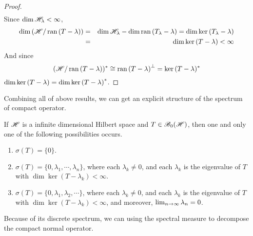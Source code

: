 \documentclass[a4paper,11pt]{report}
\begin{document}
\begin{proof}
\begin{eqnarray*}
	\end{eqnarray*}
	Since $\dim{\mathscr{H}_{\lambda}} < \infty$,
	\begin{eqnarray*}
		\dim{(\mathscr{H}/ \operatorname{ran}{(T-\lambda)})} &=& \dim{\mathscr{H}_{\lambda}} - \dim{\operatorname{ran}{(T_{\lambda}-\lambda)}} = \dim{\ker{(T_{\lambda}-\lambda)}} \\
		&=& \dim{\ker{(T-\lambda)}} < \infty
	\end{eqnarray*}
	And since
	\begin{equation*}
		(\mathscr{H} / \operatorname{ran}{(T-\lambda)})^{*} \cong \operatorname{ran}{(T-\lambda)}^{\bot} = \ker{(T-\lambda)^{*}}
	\end{equation*}
	$\dim{\ker{(T-\lambda)}} = \dim{\ker{(T-\lambda)}^{*}}$.
\end{proof}

Combining all of above results, we can get an explicit structure of the spectrum of compact operator.

\begin{thm}[Riesz]
	If $\mathscr{H}$ is a infinite dimensional Hilbert space and $T \in \mathscr{B}_{0}\mathscr{(H)}$, then one and only one of the following possibilities occurs.
	\begin{enumerate}[label=\arabic*)]
		\item $\sigma(T) = \{0\}$.
		\item $\sigma(T) = \{0,\lambda_1,\cdots,\lambda_n\}$, where each $\lambda_k \neq 0$, and each $\lambda_k$ is the eigenvalue of $T$ with $\dim{\ker{(T-\lambda_k)}}<\infty$.
		\item $\sigma(T) = \{0,\lambda_1,\lambda_2,\cdots\}$, where each $\lambda_k \neq 0$, and each $\lambda_k$ is the eigenvalue of $T$ with $\dim{\ker{(T-\lambda_k)}}<\infty$, and moreover, $\lim_{n \rightarrow \infty} \lambda_n =0$.
	\end{enumerate}
\end{thm}

Because of its discrete spectrum, we can using the spectral measure to decompose the compact normal operator.
\end{document}
